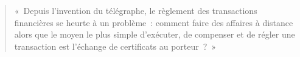 \begin{quote}
«~Depuis l'invention du télégraphe, le règlement des transactions financières se heurte à un problème~: comment faire des affaires à distance alors que le moyen le plus simple d'exécuter, de compenser et de régler une transaction est l'échange de certificats au porteur~?~»
\end{quote} %


